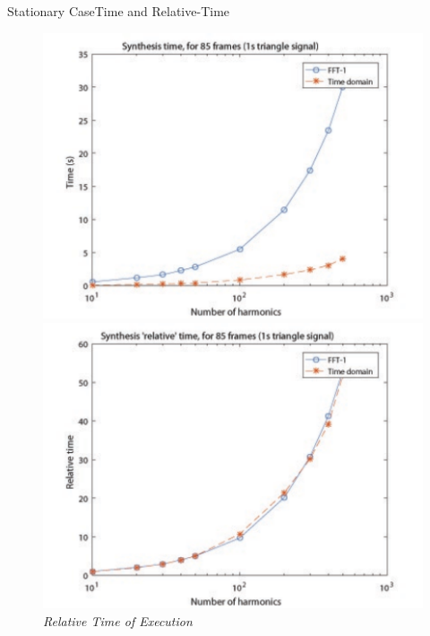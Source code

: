 \documentclass{bredelebeamer}
\begin{document}
\begin{frame}{Stationary Case}{Time and Relative-Time}
\begin{figure}
   \begin{minipage}[c]{.46\linewidth}
      \includegraphics[scale=0.4]{time.pdf}
      \caption{\it Time of execution}
   \end{minipage} \hfill
   \begin{minipage}[c]{.46\linewidth}
      \includegraphics[scale=0.4]{relativetime.pdf}
      \caption{\it Relative Time of Execution}
   \end{minipage}
\end{figure}
\end{frame}
\end{document}
